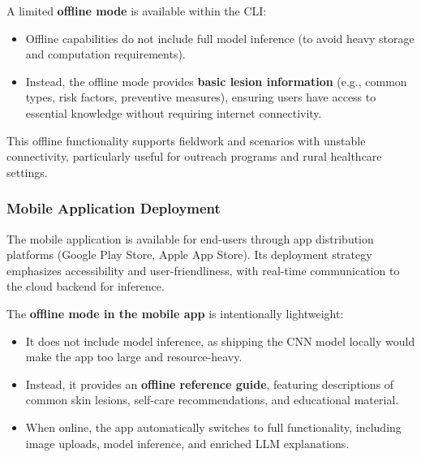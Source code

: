 \documentclass[
  12pt,
  oneside]{article}
\providecommand{\tightlist}{%
  \setlength{\itemsep}{0pt}\setlength{\parskip}{0pt}}
\begin{document}
A limited \textbf{offline mode} is available within the CLI:

\begin{itemize}
\tightlist
\item
  Offline capabilities do not include full model inference (to avoid
  heavy storage and computation requirements).\\
\item
  Instead, the offline mode provides \textbf{basic lesion information}
  (e.g., common types, risk factors, preventive measures), ensuring
  users have access to essential knowledge without requiring internet
  connectivity.
\end{itemize}

This offline functionality supports fieldwork and scenarios with
unstable connectivity, particularly useful for outreach programs and
rural healthcare settings.

\subsubsection{Mobile Application
Deployment}\label{mobile-application-deployment}

The mobile application is available for end-users through app
distribution platforms (Google Play Store, Apple App Store). Its
deployment strategy emphasizes accessibility and user-friendliness, with
real-time communication to the cloud backend for inference.

The \textbf{offline mode in the mobile app} is intentionally
lightweight:

\begin{itemize}
\tightlist
\item
  It does not include model inference, as shipping the CNN model locally
  would make the app too large and resource-heavy.\\
\item
  Instead, it provides an \textbf{offline reference guide}, featuring
  descriptions of common skin lesions, self-care recommendations, and
  educational material.\\
\item
  When online, the app automatically switches to full functionality,
  including image uploads, model inference, and enriched LLM
  explanations.
\end{itemize}
\end{document}
